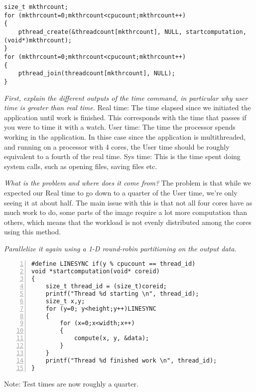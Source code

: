 \documentclass{article}
\begin{document}
\begin{ExerciseList}
\begin{lstlisting}
size_t mkthrcount;
for (mkthrcount=0;mkthrcount<cpucount;mkthrcount++)
{
	pthread_create(&threadcount[mkthrcount], NULL, startcomputation, (void*)mkthrcount);
}
for (mkthrcount=0;mkthrcount<cpucount;mkthrcount++)
{
	pthread_join(threadcount[mkthrcount], NULL);
}
\end{lstlisting}

\Question
{}
\emph{First, explain the different outputs of the time command, in
  particular why user time is greater than real time.}
\Answer Real time: The time elapsed since we initiated the application until work is finished. This corresponds with the time that passes if you were to time it with a watch. \newline
User time: The time the processor spends working in the application. In thise case since the application is multithreaded, and running on a processor with 4 cores, the User time should be roughly equivalent to a fourth of the real time. \newline
Sys time: This is the time spent doing system calls, such as opening files, saving files etc.

\Question
{} \emph{What is the problem and where does it come from?}
\Answer The problem is that while we expected our Real time to go down to a quarter of the User time, we're only seeing it at about half. The main issue with this is that not all four cores have as much work to do, some parts of the image require a lot more computation than others, which means that the workload is not evenly distributed among the cores using this method.

\Question
\emph{Parallelize it again using a 1-D round-robin partitioning on the
  output data.}

\begin{lstlisting}[basicstyle=\small\sffamily,
keywords={break,case,const,continue,default,else,enum,
for,if,return,switch,while,do,long,void,int,float,double,
char,struct,typedef,include,size\_t},
keywordstyle={\color{blue}},
comment={[l]{//}}, morecomment={[s]{/*}{*/}}, commentstyle=\itshape,
columns={[l]flexible}, numbers=left, numberstyle=\tiny,
frameround=fftt, frame=shadowbox, captionpos=b,
caption={Parallelized computation of Mandelbrot's set.},
label=LST:mandelbrot2]
#define LINESYNC if(y % cpucount == thread_id)
void *startcomputation(void* coreid)
{
    size_t thread_id = (size_t)coreid;
	printf("Thread %d starting \n", thread_id);
    size_t x,y;
	for (y=0; y<height;y++)LINESYNC
	{
		for (x=0;x<width;x++)
		{
			compute(x, y, &data);
		}
	}
	printf("Thread %d finished work \n", thread_id);
}
\end{lstlisting}
Note: Test times are now roughly a quarter.
\end{ExerciseList}
\end{document}
